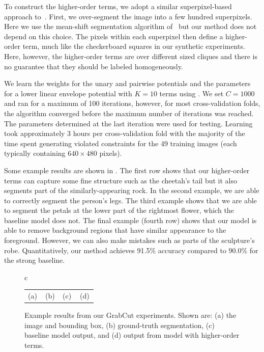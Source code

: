 \documentclass[10pt,journal,letterpaper,compsoc]{IEEEtran}
\renewcommand{\citename}{\citet}
\begin{document}
To construct the higher-order terms, we adopt a similar
superpixel-based approach to~\citename{Ladicky:ICCV09}. First, we
over-segment the image into a few hundred superpixels. Here we use the
mean-shift segmentation algorithm of~\citename{Comaniciu:PAMI02} but
our method does not depend on this choice. The pixels within each
superpixel then define a higher-order term, much like the checkerboard
squares in our synthetic experiments. Here, however, the higher-order
terms are over different sized cliques and there is no guarantee that
they should be labeled homogeneously.

We learn the weights for the unary and pairwise potentials and the
parameters for a lower linear envelope potential with $K = 10$ terms
using . We set $C = 1000$ and ran for a maximum
of 100 iterations, however, for most cross-validation folds, the
algorithm converged before the maximum number of iterations was
reached. The parameters determined at the last iteration were used for
testing. Learning took approximately 3 hours per cross-validation fold
with the majority of the time spent generating violated constraints
for the 49 training images (each typically containing $640\times480$
pixels).

Some example results are shown in . The
first row shows that our higher-order terms can capture some fine
structure such as the cheetah's tail but it also segments part of the
similarly-appearing rock. In the second example, we are able to
correctly segment the person's legs. The third example shows that we
are able to segment the petals at the lower part of the rightmost
flower, which the baseline model does not. The final example (fourth
row) shows that our model is able to remove background regions that
have similar appearance to the foreground. However, we can also make
mistakes such as parts of the sculpture's robe. Quantitatively, our
method achieves 91.5\% accuracy compared to 90.0\% for the strong
baseline.

\begin{figure}[t]
  \begin{center}
      \begin{tabular}{c}
        \begin{tabular}{p{0.24\linewidth}p{0.24\linewidth}p{0.24\linewidth}p{0.24\linewidth}}
          {\small \hspace{5mm} (a)} & 
          {\small \hspace{6.5mm} (b)} &
          {\small \hspace{8mm} (c)} & 
          {\small \hspace{9mm} (d)}
        \end{tabular}
    \end{tabular}
    \caption{\label{fig:grabcut_results} Example results from our
      GrabCut experiments. Shown are: (a) the image and bounding box,
      (b) ground-truth segmentation, (c) baseline model output, and
      (d) output from model with higher-order terms.}
  \end{center}
\end{figure}
\end{document}
